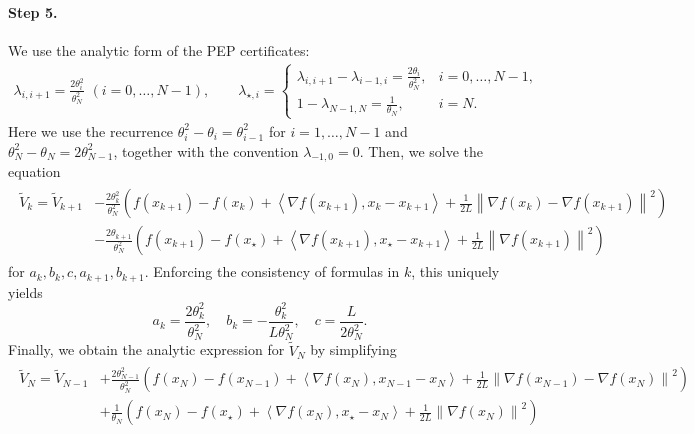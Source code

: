 \documentclass{article}
\theoremstyle{definition}
\theoremstyle{plain}
\newcommand{\inprod}[2]{\left\langle #1,#2 \right\rangle}
\newcommand{\sqnorm}[1]{\left\| #1 \right\|^2}
\begin{document}
\paragraph{Step 5.}
We use the analytic form of the PEP certificates:
\begin{align*}
    \lambda_{i,i+1}
    =
    \frac{2\theta_i^2}{\theta_N^2}
    \,\, (i=0,\dots,N-1),
    \qquad
    \lambda_{\star,i}
    =
    \begin{cases}
        \lambda_{i,i+1}-\lambda_{i-1,i} = \frac{2\theta_i}{\theta_N^2}, & i=0,\dots,N-1,\\[2mm]
        1-\lambda_{N-1,N} = \frac{1}{\theta_N}, & i=N .
    \end{cases}
\end{align*}
Here we use the recurrence $\theta_i^2 - \theta_i = \theta_{i-1}^2$ for $i=1,\dots,N-1$ and $\theta_N^2-\theta_N=2\theta_{N-1}^2$, 
together with the convention $\lambda_{-1,0}=0$.
Then, we solve the equation
\begin{align}
\label{eqn:ogm2-interior-identity}
\begin{aligned}
    \widetilde V_k
    =
    \widetilde V_{k+1}
    & - \frac{2\theta_k^2}{\theta_N^2}
    \left(
        f(x_{k+1})-f(x_k)
        +\inprod{\nabla f(x_{k+1})}{x_k-x_{k+1}}
        +\frac{1}{2L}\sqnorm{\nabla f(x_k)-\nabla f(x_{k+1})}
    \right) \\
    & - \frac{2\theta_{k+1}}{\theta_N^2}
    \left(
        f(x_{k+1})-f(x_\star)
        +\inprod{\nabla f(x_{k+1})}{x_\star-x_{k+1}}
        +\frac{1}{2L}\sqnorm{\nabla f(x_{k+1})}
    \right)
\end{aligned}
\end{align}
for $a_k,b_k,c,a_{k+1},b_{k+1}$.
Enforcing the consistency of formulas in $k$, this uniquely yields
\[
    a_k=\frac{2\theta_k^2}{\theta_N^2}, \quad 
    b_k=-\frac{\theta_k^2}{L\theta_N^2}, \quad
    c=\frac{L}{2\theta_N^2}.
\]
Finally, we obtain the analytic expression for $\widetilde V_N$ by simplifying
\begin{align}
\label{eqn:ogm2-final-identity}
\begin{aligned}
    \widetilde V_N
    =
    \widetilde V_{N-1} 
    &+ \frac{2\theta_{N-1}^2}{\theta_N^2}
    \left(
        f(x_N)-f(x_{N-1})
        +\inprod{\nabla f(x_N)}{x_{N-1}-x_N}
        +\frac{1}{2L}\sqnorm{\nabla f(x_{N-1})-\nabla f(x_N)}
    \right) \\
    &+\frac{1}{\theta_N}
    \left(
        f(x_N)-f(x_\star)
        +\inprod{\nabla f(x_N)}{x_\star-x_N}
        +\frac{1}{2L}\sqnorm{\nabla f(x_N)}
    \right)
\end{aligned}
\end{align}
\end{document}
